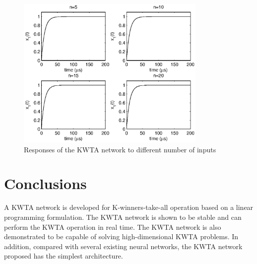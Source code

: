 \documentclass[conference]{IEEEtran}
\begin{document}
\begin{figure}[htp]
\centerline{\includegraphics[width=3.6in]{micro.eps}}
\caption{Responses of the KWTA network to different number of
inputs} \label{fig_5}
\end{figure}

\section{Conclusions}
A KWTA network is developed for K-winners-take-all operation based
on a linear programming formulation. The KWTA network is shown to be
stable and can perform the KWTA operation in real time. The KWTA
network is also demonstrated to be capable of solving
high-dimensional KWTA problems. In addition, compared with several
existing neural networks, the KWTA network proposed has the simplest
architecture.




%
%
%
\end{document}
